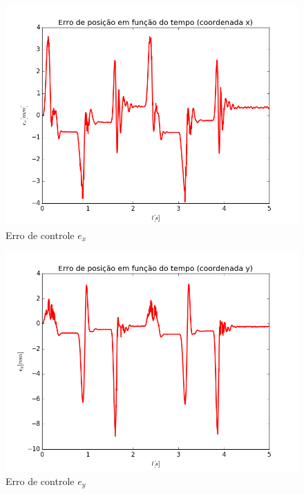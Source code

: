 \documentclass[]{politex}
\begin{document}
\begin{multicols}{2}
\begin{figure}[H]
	\centering
	\includegraphics[scale=0.39]{../../../Experimental/Aquisicoes/PIDx_triangulo/ex.png}  
	\caption{Erro de controle $e_x$}
	\label{fig:PIDx_triangulo_ex}
\end{figure}
\begin{figure}[H]
	\centering
	\includegraphics[scale=0.39]{../../../Experimental/Aquisicoes/PIDx_triangulo/ey.png}  
	\caption{Erro de controle $e_y$}
	\label{fig:PIDx_triangulo_ey}
\end{figure}
\end{multicols}
\end{document}
